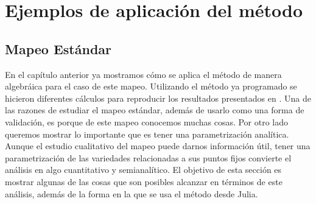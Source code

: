 
\chapter{Ejemplos de aplicación del método}
\label{SeccionEstandar}\section{Mapeo Estándar}
En el capítulo anterior ya mostramos cómo se aplica el método de manera algebráica para el caso de este mapeo. Utilizando el método ya programado se hicieron diferentes cálculos para reproducir los resultados presentados en \citep{Mireles}. Una de las razones de estudiar el mapeo estándar, además de usarlo como una forma de validación, es porque de este mapeo conocemos muchas cosas. Por otro lado queremos mostrar lo importante que es tener una parametrización analítica. Aunque el estudio cualitativo del mapeo puede darnos información útil, tener una parametrización de las variedades relacionadas a sus puntos fijos convierte el análisis en algo cuantitativo y semianalítico. El objetivo de esta sección es mostrar algunas de las cosas que son posibles alcanzar en términos de este análisis, además de la forma en la que se usa el método desde Julia.\\

